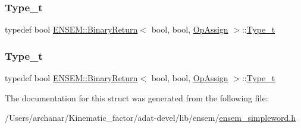 \mbox{\label{structENSEM_1_1BinaryReturn_3_01bool_00_01bool_00_01OpAssign_01_4_a5520ece3a7087e94fe3d252e1d2ab29f}} 
\subsubsection{\texorpdfstring{Type\_t}{Type\_t}\hspace{0.1cm}{\footnotesize\ttfamily [2/3]}}
{\footnotesize\ttfamily typedef bool \mbox{\hyperlink{structENSEM_1_1BinaryReturn}{E\+N\+S\+E\+M\+::\+Binary\+Return}}$<$ bool, bool, \mbox{\hyperlink{structENSEM_1_1OpAssign}{Op\+Assign}} $>$\+::\mbox{\hyperlink{structENSEM_1_1BinaryReturn_3_01bool_00_01bool_00_01OpAssign_01_4_a5520ece3a7087e94fe3d252e1d2ab29f}{Type\+\_\+t}}}

\mbox{\label{structENSEM_1_1BinaryReturn_3_01bool_00_01bool_00_01OpAssign_01_4_a5520ece3a7087e94fe3d252e1d2ab29f}} 
\subsubsection{\texorpdfstring{Type\_t}{Type\_t}\hspace{0.1cm}{\footnotesize\ttfamily [3/3]}}
{\footnotesize\ttfamily typedef bool \mbox{\hyperlink{structENSEM_1_1BinaryReturn}{E\+N\+S\+E\+M\+::\+Binary\+Return}}$<$ bool, bool, \mbox{\hyperlink{structENSEM_1_1OpAssign}{Op\+Assign}} $>$\+::\mbox{\hyperlink{structENSEM_1_1BinaryReturn_3_01bool_00_01bool_00_01OpAssign_01_4_a5520ece3a7087e94fe3d252e1d2ab29f}{Type\+\_\+t}}}



The documentation for this struct was generated from the following file\+:\begin{DoxyCompactItemize}
\item 
/\+Users/archanar/\+Kinematic\+\_\+factor/adat-\/devel/lib/ensem/\mbox{\hyperlink{adat-devel_2lib_2ensem_2ensem__simpleword_8h}{ensem\+\_\+simpleword.\+h}}\end{DoxyCompactItemize}
